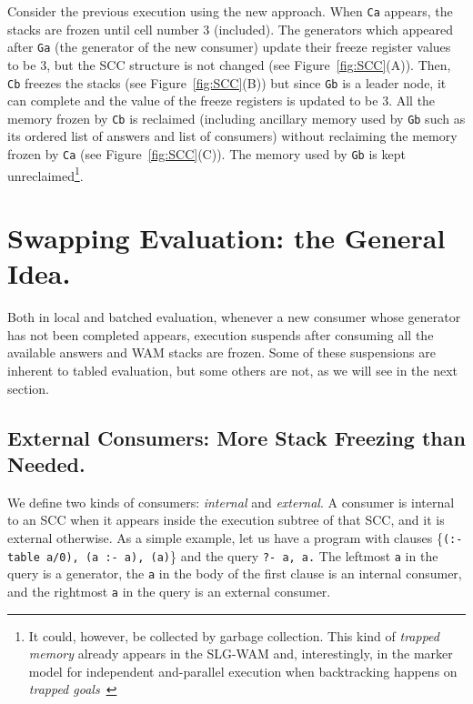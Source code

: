 \documentclass{./tlp}
\renewcommand{\mnote}[1]{}
\newcommand{\redsect}{\vspace{-1em}}
\begin{document}
Consider the previous execution using the new approach.  When
\lstinline{Ca} appears, the stacks are frozen until cell number 3
(included).  The generators which appeared after \lstinline{Ga} (the
generator of the new consumer) update their freeze register values to
be 3, but the SCC structure is not changed (see
Figure~\ref{fig:SCC}(A)).  Then, \lstinline{Cb} freezes the stacks
(see Figure~\ref{fig:SCC}(B)) but since \lstinline{Gb} is a leader
node, it can complete and the value of the freeze registers is updated
to be 3. All the memory frozen by \lstinline{Cb} is reclaimed
(including ancillary memory used by \lstinline{Gb} such as its ordered
list of answers
and list of consumers) without reclaiming the memory frozen by
\lstinline{Ca} (see Figure~\ref{fig:SCC}(C)).  The memory used by
\lstinline{Gb} is kept unreclaimed\footnote{It could, however, be
  collected by garbage collection.  This kind of \emph{trapped memory}
  already appears in the SLG-WAM and, interestingly, in the marker
  model for independent and-parallel execution when backtracking
  happens on \emph{trapped goals}~\cite{Backtracking} }.


\redsect
\section{Swapping Evaluation: the General Idea.} 
\label{sec:external-consumers} 
 
Both in local and batched evaluation, whenever a new consumer whose
generator has not been completed appears, execution suspends after
consuming all the available answers and WAM stacks are frozen. Some of
these suspensions are inherent to tabled evaluation, but some others
are not, as we will see in the next section.

\redsect
\subsection{External Consumers: More Stack Freezing than Needed.} 
\label{sec:external-problem} 
 
\mnote{New (clearer) definition?}We define two kinds of consumers:
\emph{internal} and \emph{external}. A consumer is internal to an SCC
when it appears inside the execution subtree of that SCC, and it is
external otherwise. As a simple example, let us have a program with
clauses \{\lstinline{(:-table a/0), (a :- a), (a)}\} and the query
\lstinline{?- a, a.} The leftmost \lstinline{a} in the query is a
generator, the \lstinline{a} in the body of the first clause is an
internal consumer, and the rightmost \lstinline{a} in the query is an
external consumer.
 
\end{document}

